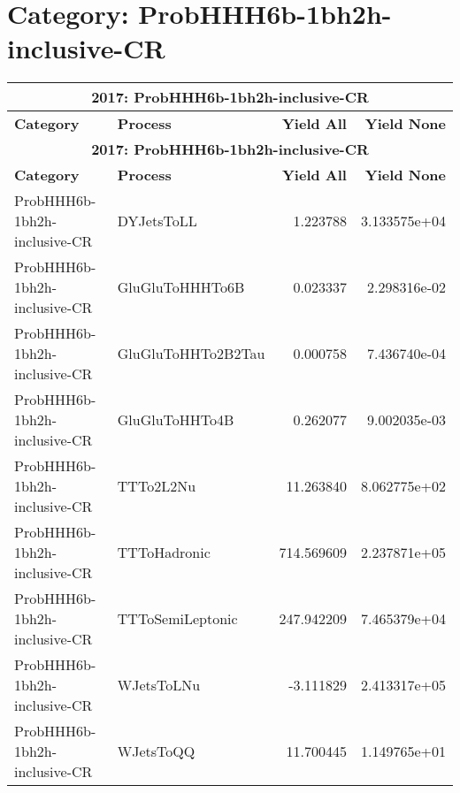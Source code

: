 \documentclass{article}
\begin{document}
\section*{Category: ProbHHH6b-1bh2h-inclusive-CR}
\begin{longtable}[c]{|l|l|r|r|}
\hline
\multicolumn{4}{|c|}{\textbf{2017: ProbHHH6b-1bh2h-inclusive-CR}} \\
\hline
\textbf{Category} & \textbf{Process} & \textbf{Yield All} & \textbf{Yield None} \\
\hline
\endfirsthead
\hline
\multicolumn{4}{|c|}{\textbf{2017: ProbHHH6b-1bh2h-inclusive-CR}} \\
\hline
\textbf{Category} & \textbf{Process} & \textbf{Yield All} & \textbf{Yield None} \\
\hline
\endhead
ProbHHH6b-1bh2h-inclusive-CR & DYJetsToLL & 1.223788 & 3.133575e+04 \\
\hline
ProbHHH6b-1bh2h-inclusive-CR & GluGluToHHHTo6B & 0.023337 & 2.298316e-02 \\
\hline
ProbHHH6b-1bh2h-inclusive-CR & GluGluToHHTo2B2Tau & 0.000758 & 7.436740e-04 \\
\hline
ProbHHH6b-1bh2h-inclusive-CR & GluGluToHHTo4B & 0.262077 & 9.002035e-03 \\
\hline
ProbHHH6b-1bh2h-inclusive-CR & TTTo2L2Nu & 11.263840 & 8.062775e+02 \\
\hline
ProbHHH6b-1bh2h-inclusive-CR & TTToHadronic & 714.569609 & 2.237871e+05 \\
\hline
ProbHHH6b-1bh2h-inclusive-CR & TTToSemiLeptonic & 247.942209 & 7.465379e+04 \\
\hline
ProbHHH6b-1bh2h-inclusive-CR & WJetsToLNu & -3.111829 & 2.413317e+05 \\
\hline
ProbHHH6b-1bh2h-inclusive-CR & WJetsToQQ & 11.700445 & 1.149765e+01 \\
\hline
\end{longtable}
\end{document}
